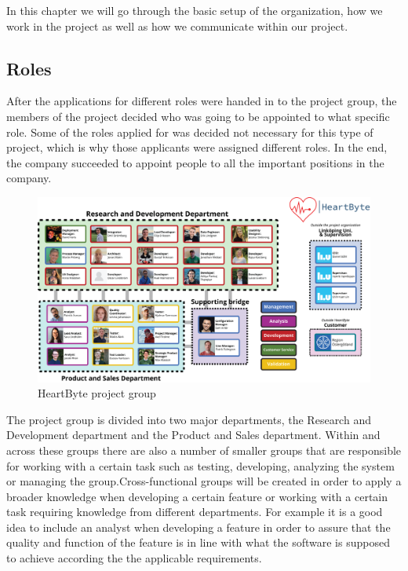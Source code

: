 In this chapter we will go through the basic setup of the organization, how we work in the project as well as how we communicate within our project. 

\subsection{Roles}
After the applications for different roles were handed in to the project group, the members of the project decided who was going to be appointed to what specific role. Some of the roles applied for was decided not necessary for this type of project, which is why those applicants were assigned different roles. In the end, the company succeeded to appoint people to all the important positions in the company. 

\begin{figure}[hbt!]
\centering
\includegraphics[width=\linewidth]{Pictures/Organization.png}
\caption{HeartByte project group}
\label{fig:company structure}
\end{figure}

The project group is divided into two major departments, the Research and Development department and the Product and Sales department. Within and across these groups there are also a number of smaller groups that are responsible for working with a certain task such as testing, developing, analyzing the system or managing the group.Cross-functional groups will be created in order to apply a broader knowledge when developing a certain feature or working with a certain task requiring knowledge from different departments. For example it is a good idea to include an analyst when developing a feature in order to assure that the quality and function of the feature is in line with what the software is supposed to achieve according the the applicable requirements. \\ 

